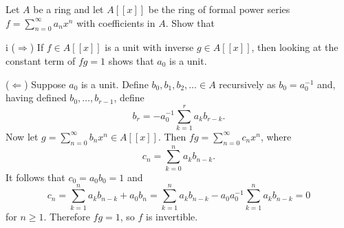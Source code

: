 \begin{exercise}
Let \(A\) be a ring and let \(A[[x]]\) be the ring of formal power series \(f = \sum_{n=0}^\infty a_n x^n\) with coefficients in \(A\).
Show that
\end{exercise}

\begin{partsolution}{i}
(\(\Rightarrow\))
If \(f\in A[[x]]\) is a unit with inverse \(g\in A[[x]]\), then looking at the constant term of \(f g = 1\) shows that \(a_0\) is a unit.

(\(\Leftarrow\))
Suppose \(a_0\) is a unit.
Define \(b_0, b_1, b_2, \ldots \in A\) recursively as \(b_0 = a_0^{-1}\) and, having defined \(b_0,\ldots,b_{r-1}\), define
\begin{equation*}
b_r = -a_0^{-1}\sum_{k=1}^r a_k b_{r-k}.
\end{equation*}
Now let \(g = \sum_{n=0}^\infty b_n x^n \in A[[x]]\).
Then \(f g = \sum_{n=0}^\infty c_n x^n\), where
\begin{equation*}
c_n = \sum_{k=0}^n a_k b_{n-k}.
\end{equation*}
It follows that \(c_0 = a_0 b_0 = 1\) and
\begin{equation*}
c_n
= \sum_{k=1}^n a_k b_{n-k} + a_0 b_n
= \sum_{k=1}^n a_k b_{n-k} - a_0 a_0^{-1} \sum_{k=1}^n a_k b_{n-k}
= 0
\end{equation*}
for \(n \geq 1\).
Therefore \(f g = 1\), so \(f\) is invertible.
\end{partsolution}


